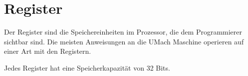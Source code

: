 \section{Register}
\label{sec:Register}

Der \gls{Register} sind die Speichereinheiten im Prozessor, die dem
Programmierer sichtbar sind.  Die meisten Anweisungen an die UMach Maschine
operieren auf einer Art mit den Registern.

Jedes Register hat eine Speicherkapazität von 32 Bits.



